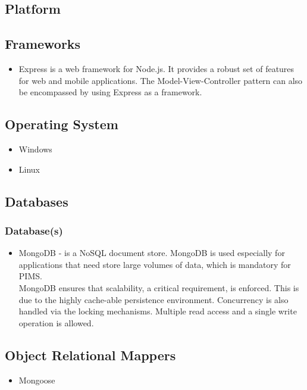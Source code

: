 \subsection{Platform}
\begin{itemize}
\end{itemize}


\subsection{Frameworks}
\begin{itemize}
		\item Express is a web framework for Node.js. It provides a robust set of features for web and mobile applications. The Model-View-Controller pattern can also be encompassed by using Express as a framework. 
\end{itemize}

\subsection{Operating System}
\begin{itemize}
		\item Windows
		\item Linux
\end{itemize}
	
	
\subsection{Databases}
\subsubsection{Database(s)}
\begin{itemize}
	\item MongoDB - is a NoSQL document store. MongoDB is used especially for applications that need store large volumes of data, which is mandatory for PIMS. \\
	MongoDB ensures that scalability, a critical requirement, is enforced. This is due to the highly cache-able persistence environment. Concurrency is also handled  via the locking mechanisms. Multiple read access and a single write operation is allowed.
\end{itemize}
	

\subsection{Object Relational Mappers}
\begin{itemize}
	\item Mongoose
\end{itemize}

